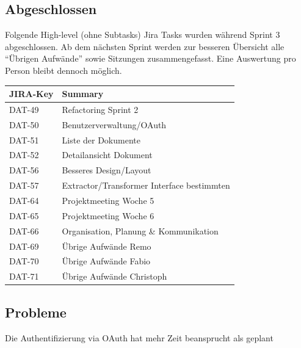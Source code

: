 \subsection{Abgeschlossen}
Folgende High-level (ohne Subtasks) Jira Tasks wurden während Sprint 3 abgeschlossen. Ab dem nächsten Sprint werden zur besseren Übersicht alle ``Übrigen Aufwände'' sowie Sitzungen zusammengefasst. Eine Auswertung pro Person bleibt dennoch möglich.

\begin{table}[H]
\centering
\begin{tabular}{ll}
	\toprule
	\textbf{JIRA-Key} & \textbf{Summary}\\
	\midrule
DAT-49 & Refactoring Sprint 2\\
DAT-50 & Benutzerverwaltung/OAuth\\
DAT-51 & Liste der Dokumente\\
DAT-52 & Detailansicht Dokument\\
DAT-56 & Besseres Design/Layout\\
DAT-57 & Extractor/Transformer Interface bestimmten\\
DAT-64 & Projektmeeting Woche 5\\
DAT-65 & Projektmeeting Woche 6\\
DAT-66 & Organisation, Planung \& Kommunikation\\
DAT-69 & Übrige Aufwände Remo\\
DAT-70 & Übrige Aufwände Fabio\\
DAT-71 & Übrige Aufwände Christoph\\
	\bottomrule
\end{tabular}	
\end{table}

\subsection{Probleme}
Die Authentifizierung via OAuth hat mehr Zeit beansprucht als geplant 
